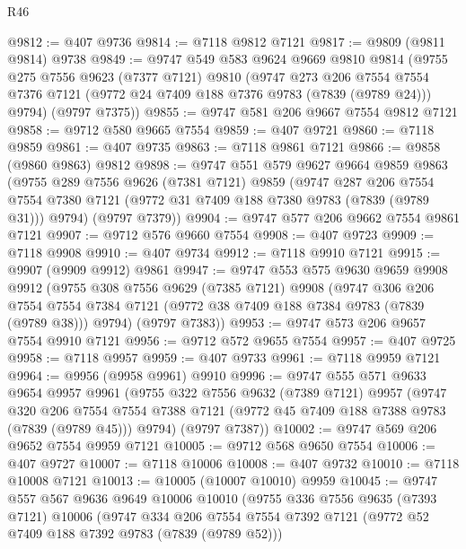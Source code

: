 \begin{lexlean}{R46}
\begin{coremodule}
@9812 := @407 @9736
@9814 := @7118 @9812 @7121
@9817 := @9809 (@9811 @9814) @9738
@9849 := @9747
    @549
    @583
    @9624
    @9669
    @9810
    @9814
    (@9755
      @275
      @7556
      @9623
      (@7377 @7121)
      @9810
      (@9747
        @273
        @206
        @7554
        @7554
        @7376
        @7121
        (@9772 @24 @7409 @188 @7376 @9783 (@7839 (@9789 @24)))
        @9794)
      (@9797 @7375))
@9855 := @9747 @581 @206 @9667 @7554 @9812 @7121
@9858 := @9712 @580 @9665 @7554
@9859 := @407 @9721
@9860 := @7118 @9859
@9861 := @407 @9735
@9863 := @7118 @9861 @7121
@9866 := @9858 (@9860 @9863) @9812
@9898 := @9747
    @551
    @579
    @9627
    @9664
    @9859
    @9863
    (@9755
      @289
      @7556
      @9626
      (@7381 @7121)
      @9859
      (@9747
        @287
        @206
        @7554
        @7554
        @7380
        @7121
        (@9772 @31 @7409 @188 @7380 @9783 (@7839 (@9789 @31)))
        @9794)
      (@9797 @7379))
@9904 := @9747 @577 @206 @9662 @7554 @9861 @7121
@9907 := @9712 @576 @9660 @7554
@9908 := @407 @9723
@9909 := @7118 @9908
@9910 := @407 @9734
@9912 := @7118 @9910 @7121
@9915 := @9907 (@9909 @9912) @9861
@9947 := @9747
    @553
    @575
    @9630
    @9659
    @9908
    @9912
    (@9755
      @308
      @7556
      @9629
      (@7385 @7121)
      @9908
      (@9747
        @306
        @206
        @7554
        @7554
        @7384
        @7121
        (@9772 @38 @7409 @188 @7384 @9783 (@7839 (@9789 @38)))
        @9794)
      (@9797 @7383))
@9953 := @9747 @573 @206 @9657 @7554 @9910 @7121
@9956 := @9712 @572 @9655 @7554
@9957 := @407 @9725
@9958 := @7118 @9957
@9959 := @407 @9733
@9961 := @7118 @9959 @7121
@9964 := @9956 (@9958 @9961) @9910
@9996 := @9747
    @555
    @571
    @9633
    @9654
    @9957
    @9961
    (@9755
      @322
      @7556
      @9632
      (@7389 @7121)
      @9957
      (@9747
        @320
        @206
        @7554
        @7554
        @7388
        @7121
        (@9772 @45 @7409 @188 @7388 @9783 (@7839 (@9789 @45)))
        @9794)
      (@9797 @7387))
@10002 := @9747 @569 @206 @9652 @7554 @9959 @7121
@10005 := @9712 @568 @9650 @7554
@10006 := @407 @9727
@10007 := @7118 @10006
@10008 := @407 @9732
@10010 := @7118 @10008 @7121
@10013 := @10005 (@10007 @10010) @9959
@10045 := @9747
    @557
    @567
    @9636
    @9649
    @10006
    @10010
    (@9755
      @336
      @7556
      @9635
      (@7393 @7121)
      @10006
      (@9747
        @334
        @206
        @7554
        @7554
        @7392
        @7121
        (@9772 @52 @7409 @188 @7392 @9783 (@7839 (@9789 @52)))

\end{coremodule}
\end{lexlean}
